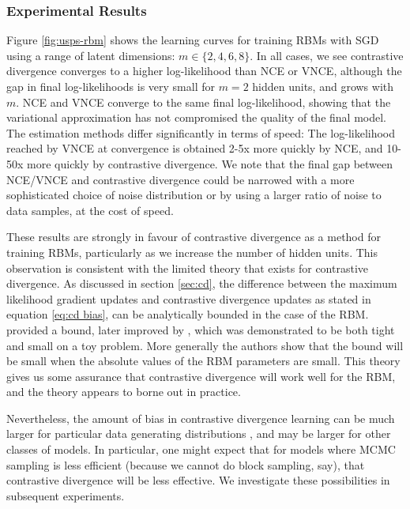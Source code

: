 \documentclass[11pt, oneside]{article}
\theoremstyle{definition}
\begin{document}
{%

\subsubsection{Experimental Results}
Figure \ref{fig:usps-rbm} shows the learning curves for training RBMs with SGD using a range of latent dimensions: $m \in \{2, 4, 6, 8\}$. In all cases, we see contrastive divergence converges to a higher log-likelihood than NCE or VNCE, although the gap in final log-likelihoods is very small for $m=2$ hidden units, and grows with $m$. NCE and VNCE converge to the same final log-likelihood, showing that the variational approximation has not compromised the quality of the final model. The estimation methods differ significantly in terms of speed: The log-likelihood reached by VNCE at convergence is obtained 2-5x more quickly by NCE, and 10-50x more quickly by contrastive divergence. We note that the final gap between NCE/VNCE and contrastive divergence could be narrowed with a more sophisticated choice of noise distribution or by using a larger ratio of noise to data samples, at the cost of speed.

These results are strongly in favour of contrastive divergence as a method for training RBMs, particularly as we increase the number of hidden units. This observation is consistent with the limited theory that exists for contrastive divergence. As discussed in section \ref{sec:cd}, the difference between the maximum likelihood gradient updates and contrastive divergence updates as stated in equation \ref{eq:cd bias}, can be analytically bounded in the case of the RBM. \citet{bengio2009justifying} provided a bound, later improved by \citet{fischer2011bounding}, which was demonstrated to be both tight and small on a toy problem. More generally the authors show that the bound will be small when the absolute values of the RBM parameters are small. This theory gives us some assurance that contrastive divergence will work well for the RBM, and the theory appears to borne out in practice.

Nevertheless, the amount of bias in contrastive divergence learning can be much larger for particular data generating distributions \citep{marlin2010inductive}, and may be larger for other classes of models. In particular, one might expect that for models where MCMC sampling is less efficient (because we cannot do block sampling, say), that contrastive divergence will be less effective. We investigate these possibilities in subsequent experiments.

}
\end{document}
